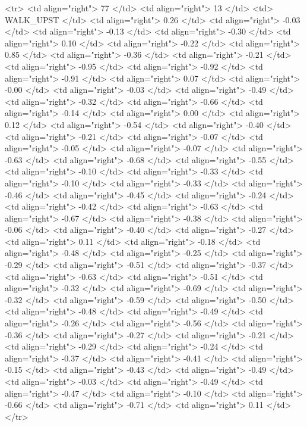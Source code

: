   <tr> <td align="right"> 77 </td> <td align="right">  13 </td> <td> WALK_UPST </td> <td align="right"> 0.26 </td> <td align="right"> -0.03 </td> <td align="right"> -0.13 </td> <td align="right"> -0.30 </td> <td align="right"> 0.10 </td> <td align="right"> -0.22 </td> <td align="right"> 0.85 </td> <td align="right"> -0.36 </td> <td align="right"> -0.21 </td> <td align="right"> -0.95 </td> <td align="right"> -0.92 </td> <td align="right"> -0.91 </td> <td align="right"> 0.07 </td> <td align="right"> -0.00 </td> <td align="right"> -0.03 </td> <td align="right"> -0.49 </td> <td align="right"> -0.32 </td> <td align="right"> -0.66 </td> <td align="right"> -0.14 </td> <td align="right"> 0.00 </td> <td align="right"> 0.12 </td> <td align="right"> -0.54 </td> <td align="right"> -0.40 </td> <td align="right"> -0.21 </td> <td align="right"> -0.07 </td> <td align="right"> -0.05 </td> <td align="right"> -0.07 </td> <td align="right"> -0.63 </td> <td align="right"> -0.68 </td> <td align="right"> -0.55 </td> <td align="right"> -0.10 </td> <td align="right"> -0.33 </td> <td align="right"> -0.10 </td> <td align="right"> -0.33 </td> <td align="right"> -0.46 </td> <td align="right"> -0.45 </td> <td align="right"> -0.24 </td> <td align="right"> -0.42 </td> <td align="right"> -0.63 </td> <td align="right"> -0.67 </td> <td align="right"> -0.38 </td> <td align="right"> -0.06 </td> <td align="right"> -0.40 </td> <td align="right"> -0.27 </td> <td align="right"> 0.11 </td> <td align="right"> -0.18 </td> <td align="right"> -0.48 </td> <td align="right"> -0.25 </td> <td align="right"> -0.29 </td> <td align="right"> -0.51 </td> <td align="right"> -0.37 </td> <td align="right"> -0.63 </td> <td align="right"> -0.51 </td> <td align="right"> -0.32 </td> <td align="right"> -0.69 </td> <td align="right"> -0.32 </td> <td align="right"> -0.59 </td> <td align="right"> -0.50 </td> <td align="right"> -0.48 </td> <td align="right"> -0.49 </td> <td align="right"> -0.26 </td> <td align="right"> -0.56 </td> <td align="right"> -0.36 </td> <td align="right"> -0.27 </td> <td align="right"> -0.21 </td> <td align="right"> -0.29 </td> <td align="right"> -0.24 </td> <td align="right"> -0.37 </td> <td align="right"> -0.41 </td> <td align="right"> -0.15 </td> <td align="right"> -0.43 </td> <td align="right"> -0.49 </td> <td align="right"> -0.03 </td> <td align="right"> -0.49 </td> <td align="right"> -0.47 </td> <td align="right"> -0.10 </td> <td align="right"> -0.66 </td> <td align="right"> -0.71 </td> <td align="right"> 0.11 </td> </tr>
